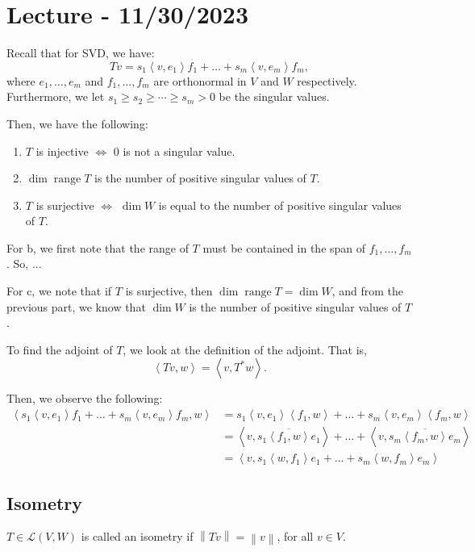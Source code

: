\documentclass[openany]{book}
\newcommand{\norm}[1]{\left\lVert{#1}\right\rVert}
\DeclareMathOperator*{\vrange}{range}
\newcommand{\innerproduct}[2]{\left\langle{#1}, {#2}\right\rangle}
\begin{document}
\section{Lecture - 11/30/2023}
Recall that for SVD, we have:
\begin{equation*}
	Tv = s_{1}\innerproduct{v}{e_{1}}f_{1} + \ldots + s_{m}\innerproduct{v}{e_{m}}f_{m},
\end{equation*}
where $e_{1}, \ldots, e_{m}$ and $f_{1}, \ldots, f_{m}$ are orthonormal in $V$ and $W$ respectively. Furthermore, we let $s_{1} \geq s_{2} \geq \cdots \geq s_{m} > 0$ be the singular values.

Then, we have the following:
\begin{enumerate}
	\item $T$ is injective $\iff$ 0 is not a singular value.
	\item $\dim \vrange T$ is the number of positive singular values of $T$.
	\item $T$ is surjective $\iff$ $\dim W$ is equal to the number of positive singular values of $T$.
\end{enumerate}

For b, we first note that the range of $T$ must be contained in the span of $f_{1}, \ldots, f_{m}$. So, ...

For c, we note that if $T$ is surjective, then $\dim \vrange T = \dim W$, and from the previous part, we know that $\dim W$ is the number of positive singular values of $T$.

To find the adjoint of $T$, we look at the definition of the adjoint. That is,
\begin{equation*}
	\innerproduct{Tv}{w} = \innerproduct{v}{T^{*}w}.
\end{equation*}

Then, we observe the following:
\begin{align*}
	\innerproduct{s_{1}\innerproduct{v}{e_{1}}f_{1} + \ldots + s_{m}\innerproduct{v}{e_{m}}f_{m}}{w} &= s_{1}\innerproduct{v}{e_{1}}\innerproduct{f_{1}}{w} + \ldots + s_{m}\innerproduct{v}{e_{m}}\innerproduct{f_{m}}{w} \\
	&= \innerproduct{v}{s_{1}\overline{\innerproduct{f_{1}}{w}}e_{1}} + \ldots + \innerproduct{v}{s_{m}\overline{\innerproduct{f_{m}}{w}}e_{m}} \\
	&= \innerproduct{v}{s_{1}\innerproduct{w}{f_{1}}e_{1} + \ldots + s_{m}\innerproduct{w}{f_{m}}e_{m}}
\end{align*}

\subsection{Isometry}
$T \in \mathcal L(V,W)$ is called an isometry if $\norm{Tv} = \norm{v}$, for all $v \in V$.
\end{document}
